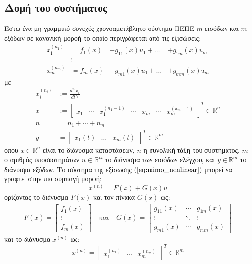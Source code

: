 \subsection{Δομή του συστήματος}
Έστω ένα μη-γραμμικό συνεχές χρονοαμετάβλητο σύστημα ΠΕΠΕ $m$ εισόδων και $m$ εξόδων σε κανονική μορφή το οποίο περιγράφεται από τις εξισώσεις:
\begin{equation}
\begin{alignedat}{3}
x_1^{(n_1)} &= f_1(x)   &+g_{11}(x) u_1 + \dots & + g_{1m}(x)u_m \\
            &\vdots & & \\
x_m^{(n_m)} &= f_m(x)  &+g_{m1}(x) u_1 + \dots & + g_{mm}(x)u_m
\end{alignedat}
\label{eq:mimo_nonlinear}
\end{equation}
με 
\begin{equation*}
\begin{split}
x_i^{(n_i)}    &:= \frac{d^{n_i} x_i }{d t^{n_i}} \\
x   &:= \begin{bmatrix} x_1 &\cdots & x_1^{(n_1-1)} & \cdots &
                               x_m &\cdots & x_m^{(n_m-1)}\end{bmatrix}^T \in \mathbb{R}^n \\
        n  &= n_1 + \cdots  + n_m \\
        y  &= \begin{bmatrix}
        x_1(t) & \dots & x_m(t)
        \end{bmatrix}^T \in \mathbb{R}^m
\end{split}
\end{equation*}
όπου $x \in \mathbb{R}^n$ είναι το διάνυσμα καταστάσεων, $n$ η συνολική τάξη του συστήματος, $m$ ο αριθμός υποσυστημάτων $u \in \mathbb{R}^m$ το διάνυσμα των εισόδων ελέγχου, και $y \in \mathbb{R}^m $ το διάνυσμα εξόδων. Το σύστημα της εξίσωσης $(\ref{eq:mimo_nonlinear})$ μπορεί να γραφτεί στην πιο συμπαγή μορφή:
\begin{equation}
	x^{(n)} = F(x) + G(x)u
	\label{eq:mimo_compact}
\end{equation}
ορίζοντας το διάνυσμα $F(x)$ και τον πίνακα $G(x)$ ως:
\begin{equation}
	\begin{matrix}
	F(x) = \begin{bmatrix} f_1(x) \\ \vdots \\ f_m(x) \end{bmatrix}
	& \: \text{και} \: &
	G(x) = \begin{bmatrix} g_{11}(x) & \cdots & g_{1m}(x) \\
						   \vdots    & \ddots & \vdots    \\
						   g_{m1}(x) & \cdots & g_{mm}(x)
	\end{bmatrix}
	\end{matrix}
	\label{eq:mimo_vec_functions}
\end{equation}
και το διάνυσμα $x^{(n)}$ ως:
\begin{equation*}
	x^{(n)} = \begin{bmatrix} x_1^{(n_1)} & \cdots & x_m^{(n_m)} \end{bmatrix}^T
	\in \mathbb{R}^m
\end{equation*}

